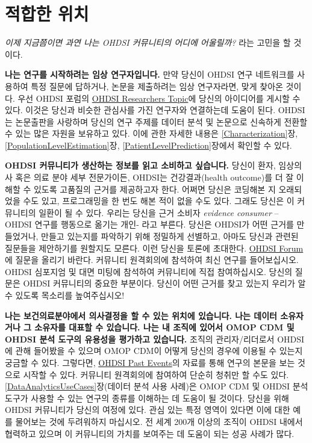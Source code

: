 \documentclass[11pt]{book}
\theoremstyle{definition}
\theoremstyle{definition}
\theoremstyle{definition}
\theoremstyle{remark}
\begin{document}
\section{적합한 위치}\label{-}

\emph{이제 지금쯤이면 과연 나는 OHDSI 커뮤니티의 어디에 어울릴까?} 라는
고민을 할 것이다.

\textbf{나는 연구를 시작하려는 임상 연구자입니다.} 만약 당신이 OHDSI
연구 네트워크를 사용하여 특정 질문에 답하거나, 논문을 제출하려는 임상
연구자라면, 맞게 찾아온 것이다. 우선 OHDSI 포럼의
\href{https://forums.ohdsi.org/c/researchers}{OHDSI Researchers Topic}에
당신의 아이디어를 게시할 수 있다. 이것은 당신과 비슷한 관심사를 가진
연구자와 연결하는데 도움이 된다. OHDSI는 논문출판을 사랑하며 당신의 연구
주제를 데이터 분석 및 논문으로 신속하게 전환할 수 있는 많은 자원을
보유하고 있다. 이에 관한 자세한 내용은 \ref{Characterization}장,
\ref{PopulationLevelEstimation}장, \ref{PatientLevelPrediction}장에서
확인할 수 있다.

\textbf{OHDSI 커뮤니티가 생산하는 정보를 읽고 소비하고 싶습니다.} 당신이
환자, 임상의사 혹은 의료 분야 세부 전문가이든, OHDSI는 건강결과(health
outcome)를 더 잘 이해할 수 있도록 고품질의 근거를 제공하고자 한다.
어쩌면 당신은 코딩해본 지 오래되었을 수도 있고, 프로그래밍을 한 번도
해본 적이 없을 수도 있다. 그래도 당신은 이 커뮤니티의 일환이 될 수 있다.
우리는 당신을 근거 소비자 \emph{evidence consumer} -- OHDSI 연구를
행동으로 옮기는 개인- 라고 부른다. 당신은 OHDSI가 어떤 근거를
만들었거나, 만들고 있는지를 파악하기 위해 정밀하게 선별하고, 아마도
당신과 관련된 질문들을 제안하기를 원할지도 모른다. 이런 당신을 토론에
초대한다. \href{http://forum.ohdsi.org}{OHDSI Forum}에 질문을 올리기
바란다. 커뮤니티 원격회의에 참석하여 최신 연구를 들어보십시오. OHDSI
심포지엄 및 대면 미팅에 참석하여 커뮤니티에 직접 참여하십시오. 당신의
질문은 OHDSI 커뮤니티의 중요한 부분이다. 당신이 어떤 근거를 찾고 있는지
우리가 알 수 있도록 목소리를 높여주십시오!

\textbf{나는 보건의료분야에서 의사결정을 할 수 있는 위치에 있습니다.
나는 데이터 소유자거나 그 소유자를 대표할 수 있습니다. 나는 내 조직에
있어서 OMOP CDM 및 OHDSI 분석 도구의 유용성을 평가하고 있습니다.} 조직의
관리자/리더로서 OHDSI에 관해 들어봤을 수 있으며 OMOP CDM이 어떻게 당신의
경우에 이용될 수 있는지 궁금할 수 있다. 그렇다면,
\href{https://www.ohdsi.org/past-events/}{OHDSI Past Events}의 자료를
통해 연구의 본문을 보는 것으로 시작할 수 있다. 커뮤니티 원격회의에
참여하여 단순히 청취만 할 수도 있다.
\ref{DataAnalyticsUseCases}장(데이터 분석 사용 사례)은 OMOP CDM 및 OHDSI
분석 도구가 사용할 수 있는 연구의 종류를 이해하는 데 도움이 될 것이다.
당신을 위해 OHDSI 커뮤니티가 당신의 여정에 있다. 관심 있는 특정 영역이
있다면 이에 대한 예를 물어보는 것에 두려워하지 마십시오. 전 세계 200개
이상의 조직이 OHDSI 내에서 협력하고 있으며 이 커뮤니티의 가치를 보여주는
데 도움이 되는 성공 사례가 많다.
\end{document}

